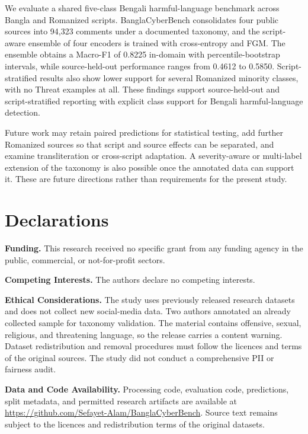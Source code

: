 \documentclass[11pt,a4paper]{article}
\newcommand{\bench}{BanglaCyberBench}
\begin{document}
We evaluate a shared five-class Bengali harmful-language benchmark across Bangla and Romanized scripts. \bench{} consolidates four public sources into 94{,}323 comments under a documented taxonomy, and the script-aware ensemble of four encoders is trained with cross-entropy and FGM. The ensemble obtains a Macro-F1 of 0.8225 in-domain with percentile-bootstrap intervals, while source-held-out performance ranges from 0.4612 to 0.5850. Script-stratified results also show lower support for several Romanized minority classes, with no Threat examples at all. These findings support source-held-out and script-stratified reporting with explicit class support for Bengali harmful-language detection.

Future work may retain paired predictions for statistical testing, add further Romanized sources so that script and source effects can be separated, and examine transliteration or cross-script adaptation. A severity-aware or multi-label extension of the taxonomy is also possible once the annotated data can support it. These are future directions rather than requirements for the present study.


\section*{Declarations}

\noindent\textbf{Funding.} This research received no specific grant from any funding agency in the public, commercial, or not-for-profit sectors.

\noindent\textbf{Competing Interests.} The authors declare no competing interests.

\noindent\textbf{Ethical Considerations.} The study uses previously released research datasets and does not collect new social-media data. Two authors annotated an already collected sample for taxonomy validation. The material contains offensive, sexual, religious, and threatening language, so the release carries a content warning. Dataset redistribution and removal procedures must follow the licences and terms of the original sources. The study did not conduct a comprehensive PII or fairness audit.

\noindent\textbf{Data and Code Availability.} Processing code, evaluation code, predictions, split metadata, and permitted research artifacts are available at \url{https://github.com/Sefayet-Alam/BanglaCyberBench}. Source text remains subject to the licences and redistribution terms of the original datasets.
\end{document}
